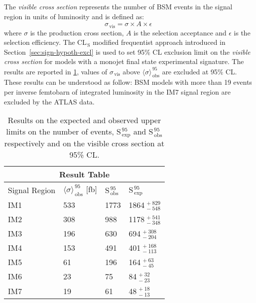 The \emph{visible cross section} represents the number of BSM events in the
signal region in units of luminosity and is defined as:
\begin{equation}
  \label{eq:90}
  \sigma_\mathrm{\, vis} = \sigma \times A \times \epsilon
\end{equation}
where $\sigma$ is the production cross section, $A$ is the selection acceptance
and $\epsilon$ is the selection efficiency. The CL$_\mathrm{\, S}$ modified
frequentist approach introduced in Section~\ref{sec:sign-hypoth-excl} is used to
set 95\% CL exclusion limit on the \emph{visible cross section} for models with
a monojet final state experimental signature. The results are reported in
\cref{tab:cs_vis_results}, values of $\sigma_\mathrm{\, vis}$ above
$\langle \sigma \rangle_\mathrm{\, obs}^{\, 95}$ are excluded at 95\%
CL\@. These results can be understood as follow: BSM models with more than 19
events per inverse femtobarn of integrated luminosity in the IM7 signal region
are excluded by the ATLAS data.
\begin{table}[!h]
  \centering
  \begin{tabular}{llll}
    \toprule
    \multicolumn{4}{c}{Result Table} \\
    \midrule \midrule
    Signal Region & $\langle \sigma \rangle_\mathrm{\, obs}^{\, 95}$ [fb] & S$_\mathrm{\, obs}^{\, 95}$ & S$_\mathrm{\, exp}^{\, 95}$ \\
    \midrule
    IM1 & 533 & 1773 & 1864$_{\, -548}^{\, +829}$ \\
    IM2 & 308 & 988 & 1178$_{\, -348}^{\, +541}$ \\
    IM3 & 196 & 630 & 694$_{\, -204}^{\, +308}$ \\
    IM4 & 153 & 491 & 401$_{\, -113}^{\, +168}$ \\
    IM5 & 61 & 196 & 164$_{\, -45}^{\, +63}$ \\
    IM6 & 23 & 75 & 84$_{\, -23}^{\, +32}$ \\
    IM7 & 19 & 61 & 48$_{\, -13}^{\, +18}$ \\
    \bottomrule
  \end{tabular}
  \caption{Results on the expected and observed upper limits on the number of
    events, S$_\mathrm{\, exp}^{\, 95}$ and S$_\mathrm{\, obs}^{\, 95}$
    respectively and on the visible cross section at 95\% CL.}
  \label{tab:cs_vis_results}
\end{table}
